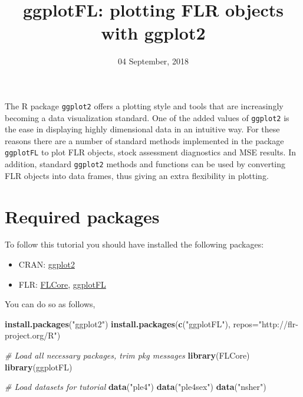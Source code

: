 \documentclass[]{article}
\title{ggplotFL: plotting FLR objects with ggplot2}
\author{}
\date{04 September, 2018}
\newenvironment{Shaded}{\begin{snugshade}}{\end{snugshade}}
\newcommand{\KeywordTok}[1]{\textcolor[rgb]{0.13,0.29,0.53}{\textbf{{#1}}}}
\newcommand{\DataTypeTok}[1]{\textcolor[rgb]{0.13,0.29,0.53}{{#1}}}
\newcommand{\StringTok}[1]{\textcolor[rgb]{0.31,0.60,0.02}{{#1}}}
\newcommand{\CommentTok}[1]{\textcolor[rgb]{0.56,0.35,0.01}{\textit{{#1}}}}
\newcommand{\NormalTok}[1]{{#1}}
\providecommand{\tightlist}{%
  \setlength{\itemsep}{0pt}\setlength{\parskip}{0pt}}
\begin{document}
\maketitle

The R package \texttt{ggplot2} offers a plotting style and tools that
are increasingly becoming a data visualization standard. One of the
added values of \texttt{ggplot2} is the ease in displaying highly
dimensional data in an intuitive way. For these reasons there are a
number of standard methods implemented in the package \texttt{ggplotFL}
to plot FLR objects, stock assessment diagnostics and MSE results. In
addition, standard \texttt{ggplot2} methods and functions can be used by
converting FLR objects into data frames, thus giving an extra
flexibility in plotting.

\section{Required packages}\label{required-packages}

To follow this tutorial you should have installed the following
packages:

\begin{itemize}
\tightlist
\item
  CRAN:
  \href{https://cran.r-project.org/web/packages/ggplot2/index.html}{ggplot2}
\item
  FLR: \href{http://www.flr-project.org/FLCore/}{FLCore},
  \href{http://www.flr-project.org/ggplotFL/}{ggplotFL}
\end{itemize}

You can do so as follows,

\begin{Shaded}
\begin{Highlighting}[]
\KeywordTok{install.packages}\NormalTok{(}\StringTok{"ggplot2"}\NormalTok{)}
\KeywordTok{install.packages}\NormalTok{(}\KeywordTok{c}\NormalTok{(}\StringTok{"ggplotFL"}\NormalTok{), }\DataTypeTok{repos=}\StringTok{"http://flr-project.org/R"}\NormalTok{)}
\end{Highlighting}
\end{Shaded}

\begin{Shaded}
\begin{Highlighting}[]
\CommentTok{# Load all necessary packages, trim pkg messages}
\KeywordTok{library}\NormalTok{(FLCore)}
\KeywordTok{library}\NormalTok{(ggplotFL)}

\CommentTok{# Load datasets for tutorial}
\KeywordTok{data}\NormalTok{(}\StringTok{"ple4"}\NormalTok{)}
\KeywordTok{data}\NormalTok{(}\StringTok{"ple4sex"}\NormalTok{)}
\KeywordTok{data}\NormalTok{(}\StringTok{"nsher"}\NormalTok{)}
\end{Highlighting}
\end{Shaded}
\end{document}
